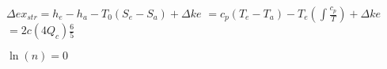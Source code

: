 \( \Delta ex_{str} = h_e - h_a - T_0 (S_e - S_a) + \Delta ke \)  
\( = c_p (T_e - T_a) - T_e \left( \int \frac{c_p}{T} \right) + \Delta ke \)  
\( = 2c (4Q_c) \frac{6}{5} \)  

\( \ln(n) = 0 \)